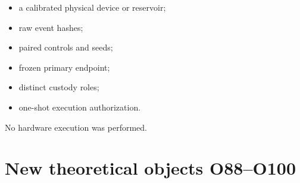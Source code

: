 \documentclass[11pt,a4paper,openany]{report}
\begin{document}
\begin{itemize}
\item 
a calibrated physical device or reservoir;

\item 
raw event hashes;

\item 
paired controls and seeds;

\item 
frozen primary endpoint;

\item 
distinct custody roles;

\item 
one-shot execution authorization.

\end{itemize}

No hardware execution was performed.

\chapter{New theoretical objects O88--O100}
\end{document}
